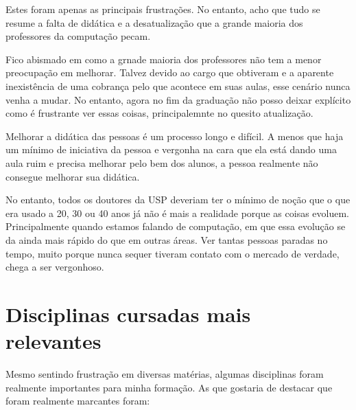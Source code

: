 \documentclass[titlepage,a4paper]{article}
\begin{document}
Estes foram apenas as principais frustrações. No entanto, acho que tudo se resume a falta de didática e a desatualização que a grande maioria dos professores da computação pecam. 

Fico abismado em como a grnade maioria dos professores não tem a menor preocupação em melhorar. Talvez devido ao cargo que obtiveram e a aparente inexistência de uma cobrança pelo que acontece em suas aulas, esse cenário nunca venha a mudar. No entanto, agora no fim da graduação não posso deixar explícito como é frustrante ver essas coisas, principalemnte no quesito atualização.

Melhorar a didática das pessoas é um processo longo e difícil. A menos que haja um mínimo de iniciativa da pessoa e vergonha na cara que ela está dando uma aula ruim e precisa melhorar pelo bem dos alunos, a pessoa realmente não consegue melhorar sua didática.

No entanto, todos os  doutores da USP deveriam ter o mínimo de noção que o que era usado a 20, 30 ou 40 anos já não é mais a realidade porque as coisas evoluem. Principalmente quando estamos falando de computação, em que essa evolução se da ainda mais rápido do que em outras áreas. Ver tantas pessoas paradas no tempo, muito porque nunca sequer tiveram contato com o mercado de verdade, chega a ser vergonhoso.

\section{Disciplinas cursadas mais relevantes}

Mesmo sentindo frustração em diversas matérias, algumas disciplinas foram realmente importantes para minha formação. As que gostaria de destacar que foram realmente marcantes foram:
\end{document}
